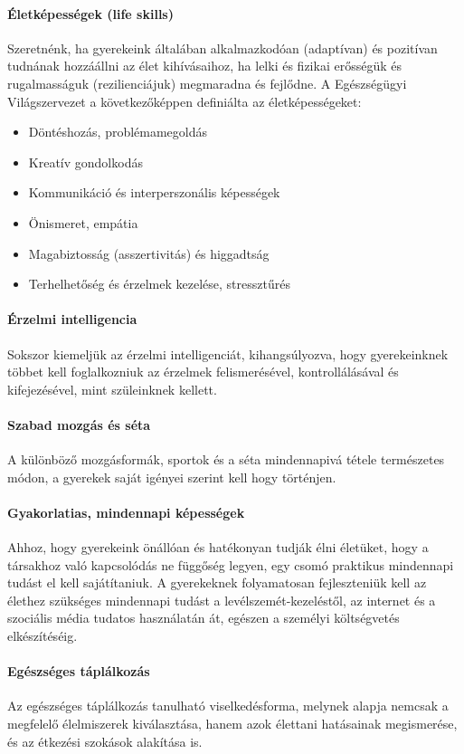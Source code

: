 \paragraph{Életképességek (life skills)}

Szeretnénk, ha gyerekeink általában alkalmazkodóan (adaptívan) és pozitívan tudnának hozzáállni az élet kihívásaihoz, ha lelki és fizikai erősségük és rugalmasságuk (rezilienciájuk) megmaradna és fejlődne.	 A Egészségügyi Világszervezet \citep{oecd99lifeskills} a következőképpen definiálta  az életképességeket:
\begin{itemize}
  \item Döntéshozás, problémamegoldás

  \item Kreatív gondolkodás

  \item Kommunikáció és interperszonális képességek

  \item Önismeret, empátia

  \item Magabiztosság (asszertivitás) és higgadtság

  \item Terhelhetőség és érzelmek kezelése, stressztűrés
\end{itemize}
\paragraph{Érzelmi intelligencia}

Sokszor kiemeljük az érzelmi intelligenciát, kihangsúlyozva, hogy gyerekeinknek többet kell foglalkozniuk az érzelmek felismerésével, kontrollálásával és kifejezésével, mint szüleinknek kellett.

\paragraph{Szabad mozgás és séta}

A különböző mozgásformák, sportok és a séta\linebreak
mindennapivá tétele természetes módon, a gyerekek saját igényei szerint kell hogy történjen.

\paragraph{Gyakorlatias, mindennapi képességek}

Ahhoz, hogy gyerekeink önállóan és hatékonyan tudják élni életüket, hogy a társakhoz való kapcsolódás ne függőség legyen, egy csomó praktikus mindennapi tudást el kell sajátítaniuk. A gyerekeknek folyamatosan fejleszteniük kell az élethez szükséges mindennapi tudást a levélszemét-kezeléstől, az internet és a szociális média tudatos használatán át, egészen a személyi költségvetés elkészítéséig.

\paragraph{Egészséges táplálkozás}

Az egészséges táplálkozás tanulható viselkedésforma, melynek alapja nemcsak a megfelelő élelmiszerek kiválasztása, hanem azok élettani hatásainak megismerése, és az étkezési szokások alakítása is.

